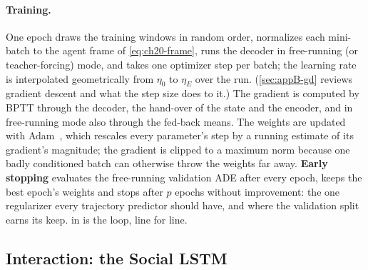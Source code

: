 \paragraph{Training.}
%
One epoch draws the training windows in random order, normalizes each
mini-batch to the agent frame of \cref{eq:ch20-frame}, runs the decoder in
free-running (or teacher-forcing) mode, and takes one optimizer step per
batch; the learning rate is interpolated geometrically from $\eta_0$ to
$\eta_E$ over the run. (\cref{sec:appB-gd} reviews gradient descent and what
the step size does to it.) The gradient is computed by BPTT through the decoder,
the hand-over of the state and the encoder, and in free-running mode also
through the fed-back means. The weights are updated with
Adam~\cite{kingma2015adam}, which rescales every parameter's step by a running
estimate of its gradient's magnitude; the gradient is clipped to a maximum
norm because one badly conditioned batch can otherwise throw the weights far
away. \textbf{Early stopping} evaluates the free-running validation ADE after
every epoch, keeps the best epoch's weights and stops after $p$ epochs
without improvement: the one regularizer every trajectory predictor should
have, and where the validation split earns its keep. 
in  is the loop, line for line.

\subsection{Interaction: the Social LSTM}
\label{sec:ch20-social}

